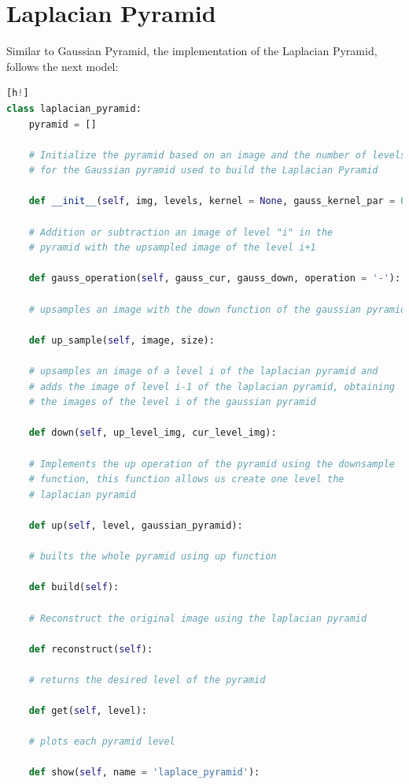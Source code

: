 \section{Laplacian Pyramid}

Similar to Gaussian Pyramid, the implementation of the Laplacian Pyramid, follows the next model:

\begin{lstlisting}[language=python][h!]
class laplacian_pyramid:
    pyramid = []
    
    # Initialize the pyramid based on an image and the number of levels, the kernel is define
    # for the Gaussian pyramid used to build the Laplacian Pyramid
    
    def __init__(self, img, levels, kernel = None, gauss_kernel_par = 0.3):  
    
    # Addition or subtraction an image of level "i" in the 
    # pyramid with the upsampled image of the level i+1 
    
    def gauss_operation(self, gauss_cur, gauss_down, operation = '-'):

    # upsamples an image with the down function of the gaussian pyramid
    
    def up_sample(self, image, size):
    
    # upsamples an image of a level i of the laplacian pyramid and 
    # adds the image of level i-1 of the laplacian pyramid, obtaining 
    # the images of the level i of the gaussian pyramid
    
    def down(self, up_level_img, cur_level_img):
    
    # Implements the up operation of the pyramid using the downsample 
    # function, this function allows us create one level the 
    # laplacian pyramid
    
    def up(self, level, gaussian_pyramid):
    
    # builts the whole pyramid using up function
    
    def build(self):  
    
    # Reconstruct the original image using the laplacian pyramid
    
    def reconstruct(self):
    
    # returns the desired level of the pyramid
    
    def get(self, level):
    
    # plots each pyramid level
    
    def show(self, name = 'laplace_pyramid'):
      
\end{lstlisting}

